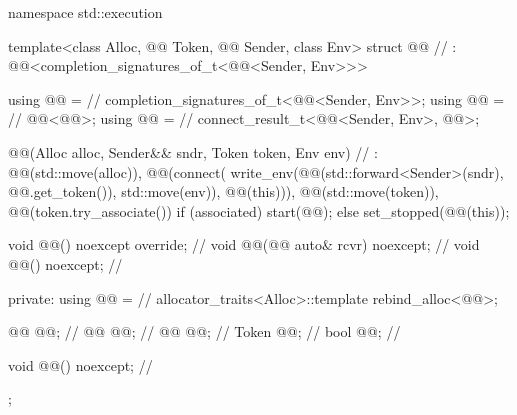 %
\begin{codeblock}
namespace std::execution {
  template<class Alloc, @@ Token, @@ Sender, class Env>
  struct @@                                                 // \expos
    : @@<completion_signatures_of_t<@@<Sender, Env>>> {
    using @@ =                                                          // \expos
      completion_signatures_of_t<@@<Sender, Env>>;
    using @@ =                                                      // \expos
      @@<@@>;
    using @@ =                                                            // \expos
      connect_result_t<@@<Sender, Env>, @@>;

    @@(Alloc alloc, Sender&& sndr, Token token, Env env)    // \expos
      : @@(std::move(alloc)),
        @@(connect(
          write_env(@@(std::forward<Sender>(sndr), @@.get_token()), std::move(env)),
          @@(this))),
        @@(std::move(token)),
        @@(token.try_associate()) {
          if (associated)
            start(@@);
          else
            set_stopped(@@(this));
        }

    void @@() noexcept override;                                      // \expos
    void @@(@@ auto& rcvr) noexcept;                             // \expos
    void @@() noexcept;                                                // \expos

  private:
    using @@ =                                                         // \expos
      allocator_traits<Alloc>::template rebind_alloc<@@>;

    @@ @@;                                                          // \expos
    @@ @@;                                                      // \expos
    @@ @@;                                                                // \expos
    Token @@;                                                            // \expos
    bool @@;                                                        // \expos

    void @@() noexcept;                                                // \expos
  };
}
\end{codeblock}

